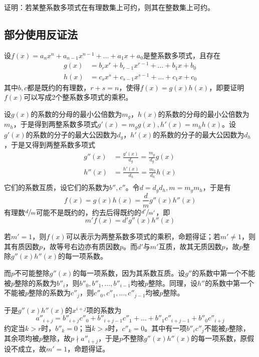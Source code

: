 

证明：若某整系数多项式在有理数集上可约，则其在整数集上可约。

\subsection{部分使用反证法}

设$f(x) = a_nx^n + a_{n - 1}x^{n - 1} + \dots + a_1x + a_0$是整系数多项式，且存在
\begin{align*}
  g(x) &= b_rx^r + b_{r - 1}x^{r - 1} + \dots + b_1x + b_0 \\
  h(x) &= c_sx^s + c_{s - 1}x^{s - 1} + \dots + c_1x + c_0
\end{align*}
其中$b, c$都是既约的有理数，$r + s = n$，使得$f(x) = g(x)h(x)$，即要证明$f(x)$可以写成2个整系数多项式的乘积。

设$g(x)$的系数的分母的最小公倍数为$m_g$，$h(x)$的系数的分母的最小公倍数为$m_h$，于是得到两整系数多项式$g'(x) = m_gg(x), h'(x) = m_hh(x)$。设$g'(x)$的系数的分子的最大公因数为$d_g$，$h'(x)$的系数的分子的最大公因数为$d_h$，于是又得到两整系数多项式
\begin{align*}
  g''(x) &= \frac{g'(x)}{d_g} = \frac{m_g}{d_g}g(x) \\
  h''(x) &= \frac{h'(x)}{d_h} = \frac{m_h}{d_h}h(x) \\
\end{align*}
它们的系数互质，设它们的系数为$b'', c''$。令$d = d_gd_h, m = m_gm_h$，于是有
\[ f(x) = g(x)h(x) = \frac dmg''(x)h''(x) \]
有理数$\sfrac dm$可能不是既约的，约去后得既约的$\sfrac {d'}{m'}$，即
\[ m'f(x) = d'g''(x)h''(x) \]

若$m' = 1$，则$f(x)$可以表示为两整系数多项式的乘积，命题得证；若$m' \ne 1$，则其有质因数$p$，故等号右边亦有质因数$p$。而$d'$与$m'$互质，故其无质因数$p$，故$p$整除$g''(x)h''(x)$的每一项系数。

而$p$不可能整除$g''(x)$的每一项系数，因为其系数互质。设$g''$的系数中第一个不能被$p$整除的系数为$b''_i$，则$b''_0, b''_1, \dots, b''_{i - 1}$均被$p$整除。同理，设$h''$的系数中第一个不能被$p$整除的系数为$c''_j$，则$c''_0, c''_1, \dots, c''_{j - 1}$均被$p$整除。

于是$g''(x)h''(x)$的$x^{i + j}$项的系数为
\[ a''_{i + j} = b''_{i + j}c''_0 + b''_{i + j - 1}c''_1 + \dots + b''_1c''_{i + j - 1} + b''_0c''_{i + j} \]
约定当$k > r$时，$b''_k = 0$；当$k > s$时，$c''_k = 0$。其中有一项$b''_ic''_j$不能被$p$整除，其余项均被$p$整除，故$p \nmid a''_{i + j}$，于是$p$不整除$g''(x)h''(x)$的每一项系数，原假设不成立，故$m' = 1$，命题得证。
